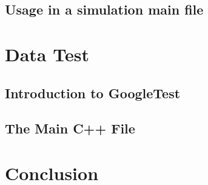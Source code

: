 \section{Usage in a simulation main file}


\chapter{Data Test}

\section{Introduction to GoogleTest}

\section{The Main C++ File}


\chapter{Conclusion}

